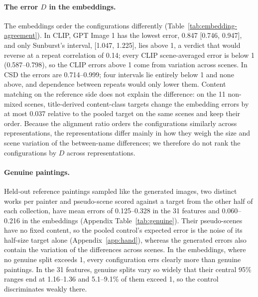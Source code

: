 \documentclass[10pt]{article}
\begin{document}


\paragraph{The error $D$ in the embeddings.} The embeddings order the configurations differently
(Table~\ref{tab:embedding-agreement}). In CLIP, GPT Image 1 has the lowest error, 0.847 [0.746,
0.947], and only Sunburst's interval, [1.047, 1.225], lies above 1, a verdict that would reverse at
a repeat correlation of 0.14; every CLIP scene-averaged error is below 1 (0.587--0.798), so the CLIP
errors above 1 come from variation across scenes. In CSD the errors are 0.714--0.999; four intervals lie entirely below
1 and none above, and dependence between repeats would only lower them. Content matching on the
reference side does not explain the difference: on the 11 non-mixed scenes, title-derived
content-class targets change the embedding errors by at most 0.037 relative to the pooled target on
the same scenes and keep their order. Because the alignment ratio orders the configurations
similarly across representations, the representations differ mainly in how they weigh the size and
scene variation of the between-name differences; we therefore do not rank the configurations by $D$
across representations.

\paragraph{Genuine paintings.} Held-out reference paintings sampled like the generated images, two
distinct works per painter and pseudo-scene scored against a target from the other half of each
collection, have mean errors of 0.125--0.328 in the 31 features and 0.060--0.216 in the embeddings
(Appendix Table~\ref{tab:genuine}). Their pseudo-scenes have no fixed content, so the pooled
control's expected error is the noise of its half-size target alone (Appendix~\ref{app:hand}),
whereas the generated errors also contain the variation of the differences across scenes. In the
embeddings, where no genuine split exceeds 1, every configuration errs clearly more than genuine
paintings. In the 31 features, genuine splits vary so widely that their central 95\% ranges end at
1.16--1.36 and 5.1--9.1\% of them exceed 1, so the control discriminates weakly there.
\end{document}
